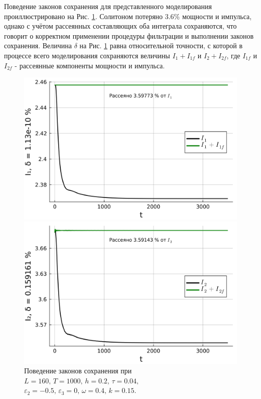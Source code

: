 \documentclass[14pt,a4paper]{extreport}
\begin{document}
			Поведение законов сохранения для представленного моделирования проиллюстрировано на Рис. \ref{fig340-5}. Солитоном потеряно 3.6\% мощности и импульса, однако с учётом рассеянных составляющих оба интеграла сохраняются, что говорит о корректном применении процедуры фильтрации и выполнении законов сохранения. Величина \(\delta\) на Рис. \ref{fig340-5} равна относительной точности, с которой в процессе всего моделирования сохраняются величины \(I_{1}+I_{1f}\) и \(I_{2}+I_{2f}\), где \(I_{1f}\) и \(I_{2f}\) - рассеянные компоненты мощности и импульса.
			\begin{figure}[H] %
				\begin{center}
					\begin{minipage}[h]{0.48\linewidth}
						\includegraphics[width=1\linewidth]{fig65.png}
					\end{minipage}
					\hfill
					\begin{minipage}[h]{0.48\linewidth}
						\includegraphics[width=1\linewidth]{fig66.png}
					\end{minipage}
				\end{center}
				\caption{Поведение законов сохранения при
				\(L=160,\, T=1000,\, h=0.2,\, \tau=0.04,\)
				\(\varepsilon_{2}=-0.5,\,\varepsilon_{3}=0,\, \omega=0.4,\, k=0.15\).}
				\label{fig340-5}
			\end{figure}
\end{document}

